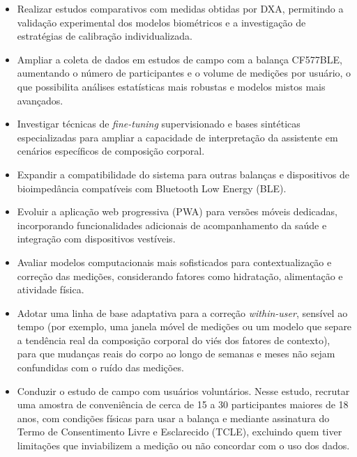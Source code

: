 \label{cap:trabalhosfuturos}

\begin{itemize}
    \item Realizar estudos comparativos com medidas obtidas por DXA, permitindo a validação
    experimental dos modelos biométricos e a investigação de estratégias de calibração
    individualizada.

    \item Ampliar a coleta de dados em estudos de campo com a balança CF577BLE, aumentando o
    número de participantes e o volume de medições por usuário, o que possibilita análises
    estatísticas mais robustas e modelos mistos mais avançados.

    \item Investigar técnicas de \emph{fine-tuning} supervisionado e bases sintéticas
    especializadas para ampliar a capacidade de interpretação da assistente em cenários
    específicos de composição corporal.

    \item Expandir a compatibilidade do sistema para outras balanças e dispositivos de
    bioimpedância compatíveis com Bluetooth Low Energy (BLE).

    \item Evoluir a aplicação web progressiva (PWA) para versões móveis dedicadas,
    incorporando funcionalidades adicionais de acompanhamento da saúde e integração com
    dispositivos vestíveis.

    \item Avaliar modelos computacionais mais sofisticados para contextualização e correção
    das medições, considerando fatores como hidratação, alimentação e atividade física.

    \item Adotar uma linha de base adaptativa para a correção \emph{within-user}, sensível ao
    tempo (por exemplo, uma janela móvel de medições ou um modelo que separe a tendência real
    da composição corporal do viés dos fatores de contexto), para que mudanças reais do corpo
    ao longo de semanas e meses não sejam confundidas com o ruído das medições.

    \item Conduzir o estudo de campo com usuários voluntários. Nesse estudo, recrutar uma
    amostra de conveniência de cerca de 15 a 30 participantes maiores de 18 anos, com
    condições físicas para usar a balança e mediante assinatura do Termo de Consentimento
    Livre e Esclarecido (TCLE), excluindo quem tiver limitações que inviabilizem a medição ou
    não concordar com o uso dos dados.


\end{itemize}
